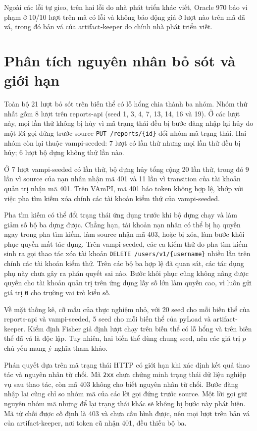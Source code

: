 Ngoài các lỗi tự gieo, trên hai lỗi do nhà phát triển khác viết, Oracle 970 báo vi phạm ở 10/10 lượt trên mã có lỗi và không báo động giả ở lượt nào trên mã đã vá, trong đó bản vá của artifact-keeper do chính nhà phát triển viết.

\section{Phân tích nguyên nhân bỏ sót và giới hạn}
\label{sec:eval_threats}

Toàn bộ 21 lượt bỏ sót trên biến thể có lỗ hổng chia thành ba nhóm. Nhóm thứ nhất gồm 8 lượt trên reports-api (seed 1, 3, 4, 7, 13, 14, 16 và 19). Ở các lượt này, mọi lần thử không bị hủy vì mã trạng thái đều bị bước đăng nhập lại hủy do một lời gọi đứng trước source \texttt{PUT /reports/\{id\}} đổi nhóm mã trạng thái. Hai nhóm còn lại thuộc vampi-seeded: 7 lượt có lần thử nhưng mọi lần thử đều bị hủy; 6 lượt bộ dựng không thử lần nào.

Ở 7 lượt vampi-seeded có lần thử, bộ dựng hủy tổng cộng 20 lần thử, trong đó 9 lần vì source của nạn nhân nhận mã 401 và 11 lần vì transition của tài khoản quản trị nhận mã 401. Trên VAmPI, mã 401 báo token không hợp lệ, khớp với việc pha tìm kiếm xóa chính các tài khoản kiểm thử của vampi-seeded.

Pha tìm kiếm có thể đổi trạng thái ứng dụng trước khi bộ dựng chạy và làm giảm số bộ ba dựng được. Chẳng hạn, tài khoản nạn nhân có thể bị hạ quyền ngay trong pha tìm kiếm, làm source nhận mã 403, hoặc bị xóa, làm bước khôi phục quyền mất tác dụng. Trên vampi-seeded, các ca kiểm thử do pha tìm kiếm sinh ra gọi thao tác xóa tài khoản \texttt{DELETE /users/v1/\{username\}} nhiều lần trên chính các tài khoản kiểm thử. Trên các bộ ba hợp lệ đã quan sát, các tác dụng phụ này chưa gây ra phán quyết sai nào. Bước khôi phục cũng không nâng được quyền cho tài khoản quản trị trên ứng dụng lấy số lớn làm quyền cao, vì luôn gửi giá trị \texttt{0} cho trường vai trò kiểu số.

Về mặt thống kê, cỡ mẫu của thực nghiệm nhỏ, với 20 seed cho mỗi biến thể của reports-api và vampi-seeded, 5 seed cho mỗi biến thể của pyLoad và artifact-keeper. Kiểm định Fisher giả định lượt chạy trên biến thể có lỗ hổng và trên biến thể đã vá là độc lập. Tuy nhiên, hai biến thể dùng chung seed, nên các giá trị $p$ chủ yếu mang ý nghĩa tham khảo.

Phán quyết dựa trên mã trạng thái HTTP có giới hạn khi xác định kết quả thao tác và nguyên nhân từ chối. Mã \texttt{2xx} chưa chứng minh trạng thái dữ liệu nghiệp vụ sau thao tác, còn mã 403 không cho biết nguyên nhân từ chối. Bước đăng nhập lại cũng chỉ so nhóm mã của các lời gọi đứng trước source. Một lời gọi giữ nguyên nhóm mã nhưng để lại trạng thái khác sẽ không bị bước này phát hiện. Mã từ chối được cố định là 403 và chưa cấu hình được, nên mọi lượt trên bản vá của artifact-keeper, nơi token cũ nhận 401, đều thiếu bộ ba.

